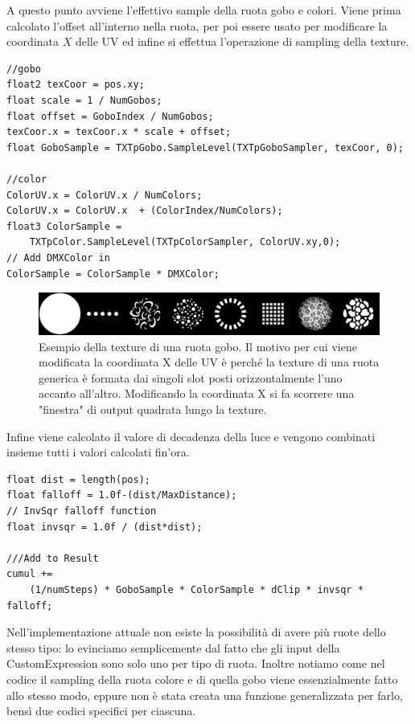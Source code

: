 \documentclass[main.tex]{subfiles}
\begin{document}
\noindent A questo punto avviene l'effettivo sample della ruota gobo e colori. Viene prima calcolato l'offset all'interno nella ruota, per poi essere usato per modificare la coordinata $X$ delle UV ed infine si effettua l'operazione di sampling della texture.
\clearpage
\begin{lstlisting}
//gobo
float2 texCoor = pos.xy;
float scale = 1 / NumGobos;
float offset = GoboIndex / NumGobos;
texCoor.x = texCoor.x * scale + offset;
float GoboSample = TXTpGobo.SampleLevel(TXTpGoboSampler, texCoor, 0);

//color
ColorUV.x = ColorUV.x / NumColors;
ColorUV.x = ColorUV.x  + (ColorIndex/NumColors);
float3 ColorSample =
    TXTpColor.SampleLevel(TXTpColorSampler, ColorUV.xy,0);
// Add DMXColor in
ColorSample = ColorSample * DMXColor;
\end{lstlisting}
\begin{figure}[H]
    \centering
    \includegraphics[width=1\linewidth]{img/renderingPipeline/Wheel_Rotating_Gobo_Wheel.jpg}
    \caption{Esempio della texture di una ruota gobo. Il motivo per cui viene modificata la coordinata X delle UV è perché la texture di una ruota generica è formata dai singoli slot posti orizzontalmente l'uno accanto all'altro. Modificando la coordinata X si fa scorrere una "finestra" di output quadrata lungo la texture.}
    \label{fig:2_goboWheel}
\end{figure}
Infine viene calcolato il valore di decadenza della luce e vengono combinati insieme tutti i valori calcolati fin'ora.
\begin{lstlisting}
float dist = length(pos);
float falloff = 1.0f-(dist/MaxDistance);
// InvSqr falloff function
float invsqr = 1.0f / (dist*dist);

///Add to Result
cumul +=
    (1/numSteps) * GoboSample * ColorSample * dClip * invsqr * falloff;
\end{lstlisting}

Nell'implementazione attuale non esiste la possibilità di avere più ruote dello stesso tipo: lo evinciamo semplicemente dal fatto che gli input della CustomExpression sono solo uno per tipo di ruota. Inoltre notiamo come nel codice il sampling della ruota colore e di quella gobo viene essenzialmente fatto allo stesso modo, eppure non è stata creata una funzione generalizzata per farlo, bensì due codici specifici per ciascuna. 
\end{document}
